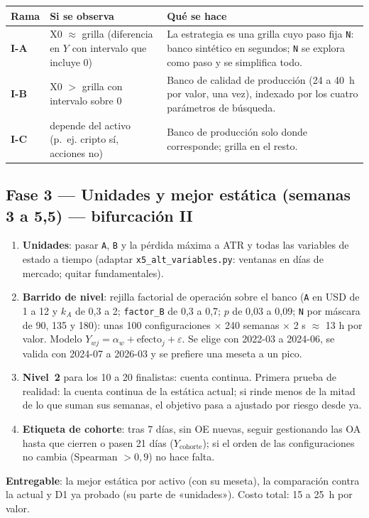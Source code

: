 \documentclass[11pt,a4paper]{article}
\newcommand{\code}[1]{\texttt{\small #1}}
\begin{document}
\begin{table}[H]
\centering\small
\begin{tabularx}{\linewidth}{lXX}
\toprule
Rama & Si se observa & Qué se hace \\
\midrule
\textbf{I-A} & X0 $\approx$ grilla (diferencia en $Y$ con intervalo que incluye 0) & La estrategia es una grilla cuyo paso fija \code{N}: banco sintético en segundos; \code{N} se explora como paso y se simplifica todo. \\
\textbf{I-B} & X0 $>$ grilla con intervalo sobre 0 & Banco de calidad de producción (24 a 40~h por valor, una vez), indexado por los cuatro parámetros de búsqueda. \\
\textbf{I-C} & depende del activo (p.~ej. cripto sí, acciones no) & Banco de producción solo donde corresponde; grilla en el resto. \\
\bottomrule
\end{tabularx}
\end{table}

\subsection{Fase 3 — Unidades y mejor estática (semanas 3 a 5,5) — bifurcación II}\label{sec:variables}
\begin{enumerate}[leftmargin=1.6em]
  \item \textbf{Unidades}: pasar \code{A}, \code{B} y la pérdida máxima a ATR y todas las variables de estado a tiempo
        (adaptar \code{x5\_alt\_variables.py}: ventanas en días de mercado; quitar fundamentales).
  \item \textbf{Barrido de nivel}: rejilla factorial de operación sobre el banco (\code{A} en USD de 1 a 12 y $k_A$ de 0,3 a 2;
        \code{factor\_B} de 0,3 a 0,7; $p$ de 0,03 a 0,09; \code{N} por máscara de 90, 135 y 180): unas 100 configuraciones
        $\times$ 240 semanas $\times$ 2 s $\approx$ 13 h por valor. Modelo $Y_{wj}=\alpha_w+\text{efecto}_j+\varepsilon$.
        Se elige con 2022-03 a 2024-06, se valida con 2024-07 a 2026-03 y se prefiere una meseta a un pico.
  \item \textbf{Nivel~2} para los 10 a 20 finalistas: cuenta continua. Primera prueba de realidad: la cuenta continua de la
        estática actual; si rinde menos de la mitad de lo que suman sus semanas, el objetivo pasa a ajustado por riesgo desde ya.
  \item \textbf{Etiqueta de cohorte}: tras 7 días, sin OE nuevas, seguir gestionando las OA hasta que cierren o pasen 21 días
        ($Y_{\mathrm{cohorte}}$); si el orden de las configuraciones no cambia (Spearman $>0{,}9$) no hace falta.
\end{enumerate}
\textbf{Entregable}: la mejor estática por activo (con su meseta), la comparación contra la actual y D1 ya probado (su
parte de «unidades»). Costo total: 15 a 25~h por valor.
\end{document}
